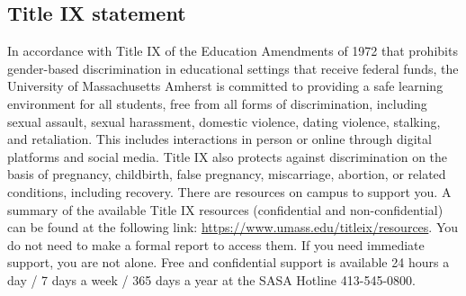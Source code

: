 \documentclass[11pt]{article}
\begin{document}
\subsection*{Title IX statement}
\label{sec:orge7923ba}
In accordance with Title IX of the Education Amendments of 1972 that prohibits
gender-based discrimination in educational settings that receive federal funds,
the University of Massachusetts Amherst is committed to providing a safe
learning environment for all students, free from all forms of discrimination,
including sexual assault, sexual harassment, domestic violence, dating
violence, stalking, and retaliation. This includes interactions in person or
online through digital platforms and social media. Title IX also protects
against discrimination on the basis of pregnancy, childbirth, false pregnancy,
miscarriage, abortion, or related conditions, including recovery. There are
resources on campus to support you. A summary of the available Title IX
resources (confidential and non-confidential) can be found at the following
link: \url{https://www.umass.edu/titleix/resources}. You do not need to make a formal
report to access them. If you need immediate support, you are not alone. Free
and confidential support is available 24 hours a day / 7 days a week / 365 days
a year at the SASA Hotline 413-545-0800.
\end{document}
